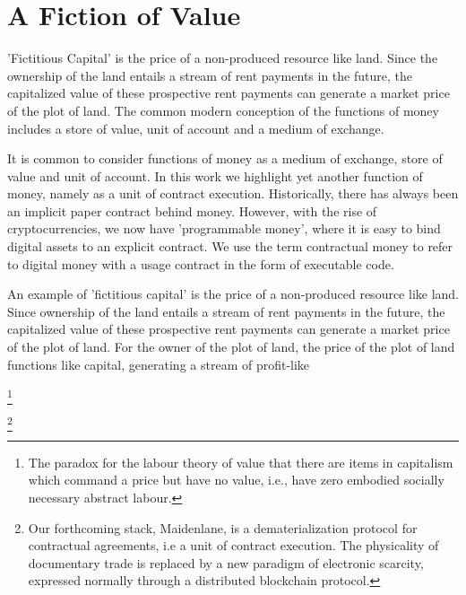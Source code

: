 \section{A Fiction of Value}
'Fictitious Capital' is the price of a non-produced resource like land. Since the ownership of the
land entails a stream of rent payments in the future, the capitalized value of these prospective
rent payments can generate a market price of the plot of land.  The common modern conception of the functions of money
includes a store of value, unit of account and a medium of exchange.

It is common to consider functions of money as a medium of exchange, store of value and unit of 
account. In this work we highlight yet another function of money, namely as a unit of contract 
execution. Historically, there has always been an implicit paper contract behind money. However, 
with the rise of cryptocurrencies, we now have 'programmable money', where it is easy to bind 
digital assets to an explicit contract. We use the term contractual money to refer to digital 
money with a usage contract in the form of executable code.

An example of 'fictitious capital' is the price of a non-produced resource like land.
Since ownership of the land entails a stream of rent payments in the future, the capitalized value
of these prospective rent payments can generate a market price of the plot of land. For the owner 
of the plot of land, the price of the plot of land functions like capital, generating a stream of 
profit-like


\footnote{The paradox for the labour theory of value that there are items in capitalism which command a 
price but have no value, i.e., have zero embodied socially necessary abstract labour.}

\footnote{Our forthcoming stack, Maidenlane, is a  dematerialization protocol for contractual agreements, i.e  a unit of
contract 
execution. The physicality of documentary trade is replaced by a new paradigm of electronic 
scarcity, expressed normally through a distributed blockchain protocol.  }
